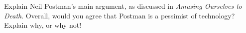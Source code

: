 \needspace{2cm}
\question[5] Explain Neil Postman's main argument, as discussed in \textit{Amusing Ourselves to Death}.
Overall, would you agree that Postman is a pessimist of technology?
Explain why, or why not!
\vspace{6cm}
